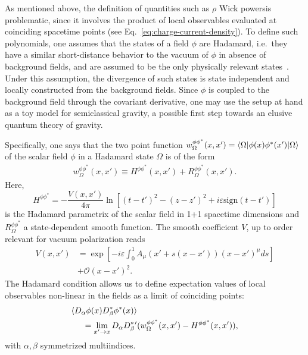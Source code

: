 As mentioned above, the definition of quantities such as $\rho$ \textemdash Wick powers\textemdash is problematic, since it involves the product of local observables 
evaluated at coinciding spacetime points (see Eq.~\eqref{eq:charge-current-density}).
To define such polynomials, one assumes that the states of a field $\phi$ are Hadamard, i.e.~they have a similar short-distance behavior to the vacuum of  $\phi$ in absence of background fields, and are assumed to be the only physically relevant states~\cite{fewster_necessity_2013}. Under this assumption, the divergence of such states is state independent and locally constructed from the background fields. Since $\phi$ is coupled to the background field through the covariant derivative, one may use the setup at hand as a toy model for semiclassical gravity, a possible first step towards an elusive quantum theory of gravity.

Specifically, one says that the two point function  $w_{\Omega}^{\phi \phi^*}(x, x') = \braket{\Omega | \phi (x)\phi^* (x')| \Omega} $ of the scalar field $\phi$ in
a Hadamard state $\Omega$  is of the form
\begin{align}
    w_{\Omega}^{\phi\phi^*}(x, x') 
    \equiv H^{\phi \phi^*}(x, x')  + R^{\phi \phi^*}_{\Omega} (x, x').
    \label{eq:hadamard-condition}
\end{align}
Here,
\begin{equation}
    H^{\phi\phi^*} = -\frac{V(x,x')}{4\pi} \ln [(t-t')^2 -
    (z-z')^2 + i\varepsilon \text{sign} (t-t')]
    \label{eq:hadamard-parametrix}
\end{equation}
is the Hadamard parametrix of the scalar field in 1+1 spacetime dimensions and $R_{\Omega}^{\phi\phi^*}$
a state-dependent smooth function. 
The smooth coefficient $V$, up to order relevant for vacuum polarization reads \cite{schlemmer_current_2015}
\begin{align*}
    V(x, x') &= \exp\left[-i\varepsilon \int_{0}^{1} A_{\mu}(x' +
    s(x-x') ) (x - x')^{\mu}ds \right] \\&+ \mathcal{O}(x-x')^2.
\end{align*} 
The Hadamard condition allows us to define expectation values of
local observables non-linear in the fields as a limit of coinciding points:
\begin{align}
\begin{split}
         \braket{D_\alpha \phi (x) D^{*}_\beta \phi^*(x)} & \\= \lim_{x' \to x}
    D_\alpha D^{*}_\beta{}' &(w_\Omega^{\phi \phi^*}(x, x')- H^{\phi\phi^*}(x,
    x')),
\end{split}
    \label{eq:point-splitting}
\end{align}
with $\alpha, \beta$ symmetrized multiindices. 

